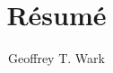 \documentclass{article}
\begin{document}
\title{R\'esum\'e}
\author{Geoffrey T. Wark}

\maketitle
\end{document}
